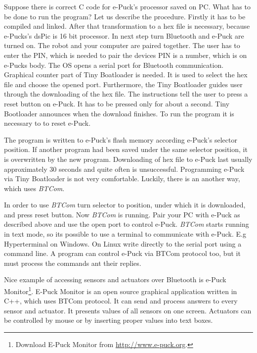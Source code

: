   Suppose there is correct C code for e-Puck's processor saved on PC. What has to be done to run the program?
  Let us describe the procedure.
  Firstly it has to be compiled and linked. After that transformation to a hex file is necessary,
  because e-Pucks's dsPic is 16 bit processor. In next step turn Bluetooth and e-Puck are turned on. 
  The robot and your computer are paired together. The user has to enter the PIN, 
  which is needed to pair the devices 
  PIN is a number, which is on e-Pucks body.
  The OS opens a serial port for Bluetooth communication.
  Graphical counter part of Tiny Boatloader is needed. It is used to select the hex file and choose the opened port. 
  Furthermore, the Tiny Boatloader guides user through the downloading of the hex file.
  The instructions tell the user to press a reset button on e-Puck. It has to be pressed only for about a second.
  Tiny Bootloader announces when the download finishes. To run the program it is necessary to to reset e-Puck.
   
  The program is written to e-Puck's flash memory according e-Puck's selector position.
  If another program had been saved under the same selector position, it is overwritten by the new program.
  Downloading of hex file to e-Puck last usually approximately 30 seconds and quite often is unsuccessful. 
  Programming e-Puck via Tiny Boatloader is not very comfortable. 
  Luckily, there is an another way, which uses {\it BTCom}. 

  In order to use {\it BTCom} turn selector to position, under which it is downloaded, and press reset button.
  Now {\it BTCom} is running.  Pair your PC with e-Puck as described above and use the open port
  to control e-Puck.
  {\it BTCom} starts running in text mode, so its possible to use a terminal to communicate with e-Puck.
  E.g Hyperterminal on Windows. On Linux write directly to the serial port using a command line.
  A program can control e-Puck via BTCom protocol too, but it must process the commands ant their replies.
   
  Nice example of accessing sensors and actuators over Bluetooth is 
  e-Puck Monitor\footnote{\small{Download E-Puck Monitor from \url{http://www.e-puck.org}.}}.
  E-Puck Monitor is an open source graphical application written in C++, which uses BTCom protocol. 
  It can send and process answers to every sensor and actuator.
  It presents values of all sensors on one screen. Actuators can be controlled by mouse or by inserting
  proper values into text boxes.

